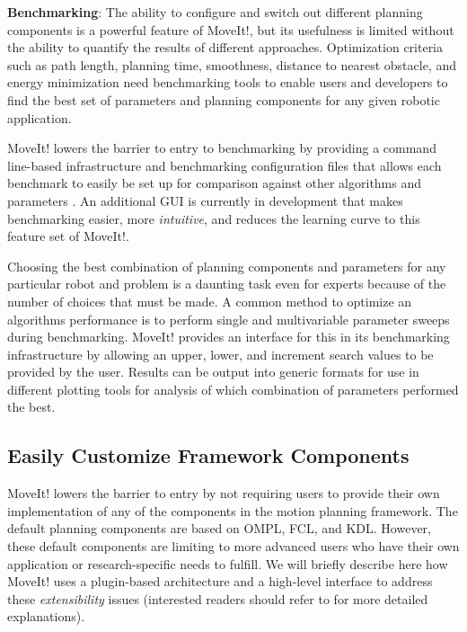 \documentclass[10pt,journal,compsoc]{joser1}
\begin{document}
{{\bf Benchmarking}: The ability to configure and switch out different planning components is a powerful feature of MoveIt!, but its usefulness is limited without the ability to quantify the results of different approaches. Optimization criteria such as path length, planning time, smoothness, distance to nearest obstacle, and energy minimization need benchmarking tools to enable users and developers to find the best set of parameters and planning components for any given robotic application.

MoveIt! lowers the barrier to entry to benchmarking by providing a command line-based infrastructure and benchmarking configuration files that allows each benchmark to easily be set up for comparison against other algorithms and parameters \cite{cohen2012generic}. An additional GUI is currently in development that makes benchmarking easier, more \textit{intuitive}, and reduces the learning curve to this feature set of MoveIt!.

Choosing the best combination of planning components and parameters for any particular robot and problem is a daunting task even for experts because of the number of choices that must be made\cite{cohen2012generic}. A common method to optimize an algorithms performance is to perform single and multivariable parameter sweeps during benchmarking. MoveIt! provides an interface for this in its benchmarking infrastructure by allowing an upper, lower, and increment search values to be provided by the user. Results can be output into generic formats for use in different plotting tools for analysis of which combination of parameters performed the best.

\subsection{Easily Customize Framework Components}
\label{subsec:extensiblity}

MoveIt! lowers the barrier to entry by not requiring users to provide their own implementation of any of the components in the motion planning framework. The default planning components are based on OMPL, FCL, and KDL. However, these default components are limiting to more advanced users who have their own application or research-specific needs to fulfill. We will briefly describe here how MoveIt! uses a plugin-based architecture and a high-level interface to address these \textit{extensibility} issues (interested readers should refer to \cite{moveit} for more detailed explanations). 

}
\end{document}
